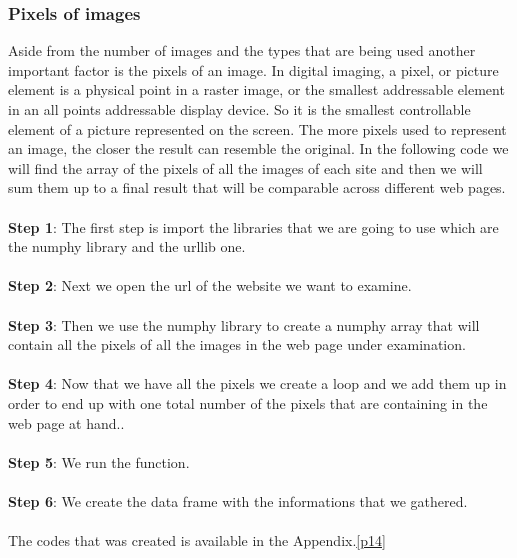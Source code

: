 \documentclass{book}
\begin{document}
\subsubsection{Pixels of images}\label{dif_img_s} 
Aside from the number of images and the types that are being used another important factor is the pixels of an image. In digital imaging, a pixel, or picture element is a physical point in a raster image, or the smallest addressable element in an all points addressable display device. So it is the smallest controllable element of a picture represented on the screen. The more pixels used to represent an image, the closer the result can resemble the original. In the following code we will find the array of the pixels of all the images of each site and then we will sum them up to a final result that will be comparable across different web pages. \\\\
\textbf{Step 1}: The first step is import the libraries that we are going to use which are the numphy library and the urllib one. \\\\
\textbf{Step 2}: Next we open the url of the website we want to examine.\\\\
\textbf{Step 3}: Then we use the numphy library to create a numphy array that will contain all the pixels of all the images in the web page under examination. \\\\
\textbf{Step 4}: Now that we have all the pixels we create a loop and we add them up in order to end up with one total number of the pixels that are containing in the web page at hand..\\\\
\textbf{Step 5}: We run the function.\\\\
\textbf{Step 6}: We create the data frame with the informations that we gathered.\\\\
The codes that was created is available in the Appendix.\ref{p14}                
\end{document}

